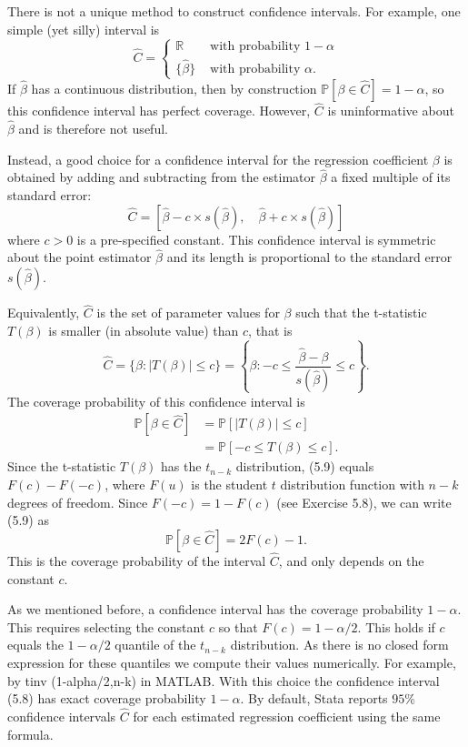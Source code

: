 \documentclass[10pt]{article}
\begin{document}
There is not a unique method to construct confidence intervals. For example, one simple (yet silly) interval is
$$
\widehat{C}=\left\{\begin{array}{cc}
\mathbb{R} & \text { with probability } 1-\alpha \\
\{\widehat{\beta}\} & \text { with probability } \alpha .
\end{array}\right.
$$
If $\widehat{\beta}$ has a continuous distribution, then by construction $\mathbb{P}[\beta \in \widehat{C}]=1-\alpha$, so this confidence interval has perfect coverage. However, $\widehat{C}$ is uninformative about $\widehat{\beta}$ and is therefore not useful.

Instead, a good choice for a confidence interval for the regression coefficient $\beta$ is obtained by adding and subtracting from the estimator $\widehat{\beta}$ a fixed multiple of its standard error:
$$
\widehat{C}=[\widehat{\beta}-c \times s(\widehat{\beta}), \quad \widehat{\beta}+c \times s(\widehat{\beta})]
$$
where $c>0$ is a pre-specified constant. This confidence interval is symmetric about the point estimator $\widehat{\beta}$ and its length is proportional to the standard error $s(\widehat{\beta})$.

Equivalently, $\widehat{C}$ is the set of parameter values for $\beta$ such that the t-statistic $T(\beta)$ is smaller (in absolute value) than $c$, that is
$$
\widehat{C}=\{\beta:|T(\beta)| \leq c\}=\left\{\beta:-c \leq \frac{\widehat{\beta}-\beta}{s(\widehat{\beta})} \leq c\right\} .
$$
The coverage probability of this confidence interval is
$$
\begin{aligned}
\mathbb{P}[\beta \in \widehat{C}] &=\mathbb{P}[|T(\beta)| \leq c] \\
&=\mathbb{P}[-c \leq T(\beta) \leq c] .
\end{aligned}
$$
Since the t-statistic $T(\beta)$ has the $t_{n-k}$ distribution, (5.9) equals $F(c)-F(-c)$, where $F(u)$ is the student $t$ distribution function with $n-k$ degrees of freedom. Since $F(-c)=1-F(c)$ (see Exercise 5.8), we can write (5.9) as
$$
\mathbb{P}[\beta \in \widehat{C}]=2 F(c)-1 .
$$
This is the coverage probability of the interval $\widehat{C}$, and only depends on the constant $c$.

As we mentioned before, a confidence interval has the coverage probability $1-\alpha$. This requires selecting the constant $c$ so that $F(c)=1-\alpha / 2$. This holds if $c$ equals the $1-\alpha / 2$ quantile of the $t_{n-k}$ distribution. As there is no closed form expression for these quantiles we compute their values numerically. For example, by tinv (1-alpha/2,n-k) in MATLAB. With this choice the confidence interval (5.8) has exact coverage probability $1-\alpha$. By default, Stata reports $95 \%$ confidence intervals $\widehat{C}$ for each estimated regression coefficient using the same formula.
\end{document}
